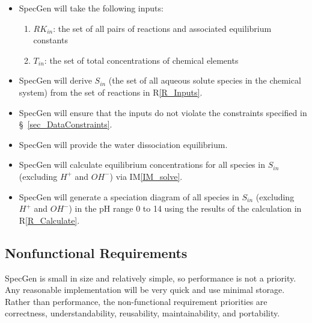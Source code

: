 \documentclass[12pt]{article}
\newcommand{\iref}[1]{IM\ref{#1}}
\newcounter{reqnum} %
\newcommand{\rref}[1]{R\ref{#1}}
\newcommand{\sref}[1]{\S~\ref{#1}}
\newcommand{\progname}{SpecGen} %
\begin{document}
\noindent \begin{itemize}

\item[R\refstepcounter{reqnum}\thereqnum \label{R_Inputs}:] \progname{} will take the following inputs:
  \begin{enumerate} \item ${RK}_{in}$: the set of all pairs of reactions and associated equilibrium constants 
                    \item $T_{in}$: the set of total concentrations of chemical elements
  \end{enumerate}

\item[R\refstepcounter{reqnum}\thereqnum \label{R_DerivedInputs}:] \progname{} will derive $S_{in}$ (the set of all aqueous solute species in the chemical system) from the set of reactions in \rref{R_Inputs}.

\item[R\refstepcounter{reqnum}\thereqnum \label{R_ValidateInputs}:] \progname{} will ensure that the inputs do not violate the constraints specified in \sref{sec_DataConstraints}.

\item[R\refstepcounter{reqnum}\thereqnum \label{R_Water}:] \progname{} will provide the water dissociation equilibrium.

\item[R\refstepcounter{reqnum}\thereqnum \label{R_Calculate}:] \progname{} will calculate equilibrium concentrations for all species in $S_{in}$ (excluding $H^+$ and $OH^-$) via \iref{IM_solve}.

\item[R\refstepcounter{reqnum}\thereqnum \label{R_Output}:] \progname{} will generate a speciation diagram of all species in $S_{in}$ (excluding $H^+$ and $OH^-$) in the pH range 0 to 14 using the results of the calculation in \rref{R_Calculate}.

\end{itemize}


\subsection{Nonfunctional Requirements}
\progname{} is small in size and relatively simple, so performance is not a priority. Any reasonable implementation will be very quick and use minimal storage. Rather than performance, the non-functional requirement priorities are correctness, understandability, reusability, maintainability, and portability. 
\end{document}
